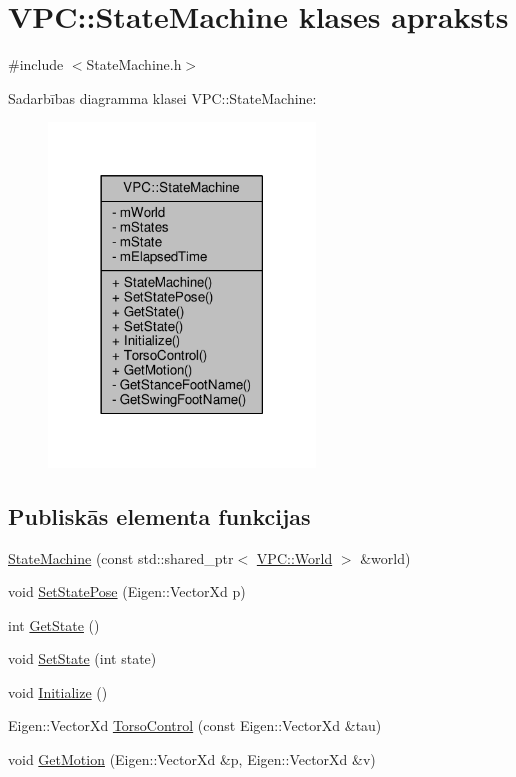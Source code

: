 \hypertarget{class_v_p_c_1_1_state_machine}{}\section{V\+PC\+:\+:State\+Machine klases apraksts}
\label{class_v_p_c_1_1_state_machine}


{\ttfamily \#include $<$State\+Machine.\+h$>$}



Sadarbības diagramma klasei V\+PC\+:\+:State\+Machine\+:
\nopagebreak
\begin{figure}[H]
\begin{center}
\leavevmode
\includegraphics[width=201pt]{class_v_p_c_1_1_state_machine__coll__graph}
\end{center}
\end{figure}
\subsection*{Publiskās elementa funkcijas}
\begin{DoxyCompactItemize}
\item 
\hyperlink{class_v_p_c_1_1_state_machine_a2c351c164a0a6cfd999ef8c1a50c8747}{State\+Machine} (const std\+::shared\+\_\+ptr$<$ \hyperlink{class_v_p_c_1_1_world}{V\+P\+C\+::\+World} $>$ \&world)
\item 
void \hyperlink{class_v_p_c_1_1_state_machine_af1b80fe57cbacfe9b2cb29ef8a0a29ff}{Set\+State\+Pose} (Eigen\+::\+Vector\+Xd p)
\item 
int \hyperlink{class_v_p_c_1_1_state_machine_a4a9ff71162129142a4eeb70b209be439}{Get\+State} ()
\item 
void \hyperlink{class_v_p_c_1_1_state_machine_a377178b83696e6ad08504858930bef8c}{Set\+State} (int state)
\item 
void \hyperlink{class_v_p_c_1_1_state_machine_a74cd487408c3ae67046fdaf429b25ca7}{Initialize} ()
\item 
Eigen\+::\+Vector\+Xd \hyperlink{class_v_p_c_1_1_state_machine_a09f8ecfe81b0e075f648b81cf545fd89}{Torso\+Control} (const Eigen\+::\+Vector\+Xd \&tau)
\item 
void \hyperlink{class_v_p_c_1_1_state_machine_a83142e6c04d30eeb8beb49b331ba5b74}{Get\+Motion} (Eigen\+::\+Vector\+Xd \&p, Eigen\+::\+Vector\+Xd \&v)
\end{DoxyCompactItemize}
